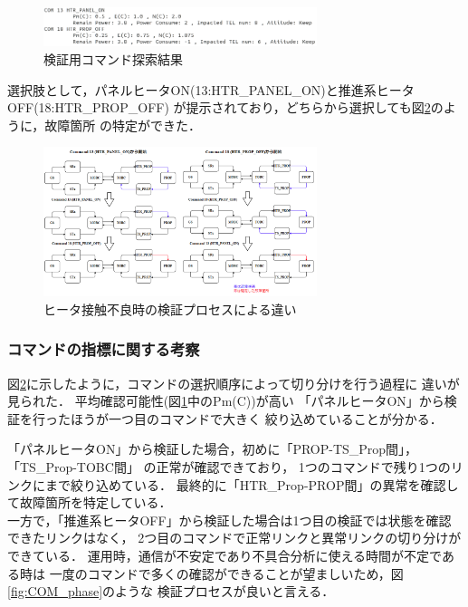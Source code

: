 \documentclass[11pt]{jsarticle}%
\begin{document}
\begin{multicols}{2}
 \begin{figure}[H]
   \centering
     \includegraphics[width=8.0cm]{../figure/COM_candidate.png}
     \caption{検証用コマンド探索結果}
     \label{fig:COM_candidate}%
 \end{figure}
選択肢として，パネルヒータON(13:HTR\_PANEL\_ON)と推進系ヒータOFF(18:HTR\_PROP\_OFF)
が提示されており，どちらから選択しても図\ref{fig:COM_process}のように，故障箇所
の特定ができた．
\begin{figure}[H]
  \centering
    \includegraphics[width=8.0cm]{../figure/COM_process_HTR_PROP_fault.png}
    \caption{ヒータ接触不良時の検証プロセスによる違い}
    \label{fig:COM_process}
\end{figure}
\subsubsection{コマンドの指標に関する考察}
図\ref{fig:COM_process}に示したように，コマンドの選択順序によって切り分けを行う過程に
違いが見られた．
平均確認可能性(図\ref{fig:COM_candidate}中のPm(C))が高い
「パネルヒータON」から検証を行ったほうが一つ目のコマンドで大きく
絞り込めていることが分かる．

「パネルヒータON」から検証した場合，初めに「PROP-TS\_Prop間」，「TS\_Prop-TOBC間」%
の正常が確認できており，
1つのコマンドで残り1つのリンクにまで絞り込めている．%
最終的に「HTR\_Prop-PROP間」の異常を確認して故障箇所を特定している．\\
一方で，「推進系ヒータOFF」から検証した場合は1つ目の検証では状態を確認できたリンクはなく，
2つ目のコマンドで正常リンクと異常リンクの切り分けができている．
運用時，通信が不安定であり不具合分析に使える時間が不定である時は
一度のコマンドで多くの確認ができることが望ましいため，図\ref{fig:COM_phase}のような
検証プロセスが良いと言える．


\end{multicols}
\end{document}
